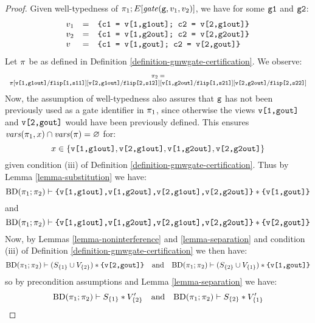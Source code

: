 \begin{proof}
  Given well-typedness of $\pi_1;E[\mathit{gate}(\texttt{g},v_1,v_2)]$, we have for some $\texttt{g1}$ and $\texttt{g2}$:
  $$
  \begin{array}{lcl}
   v_1 &=& \texttt{\{c1 = v[1,g1out]; c2 = v[2,g1out]\}}\\
   v_2 &=& \texttt{\{c1 = v[1,g2out]; c2 = v[2,g2out]\}}\\
    v &=& \texttt{\{c1 = v[1,gout]; c2 = v[2,gout]\}}
  \end{array}
  $$
  Let $\pi$ be as defined in Definition \ref{definition-gmwgate-certification}.
  We observe:
  $$
  {\footnotesize
    \begin{array}{c}
      \pi_2 = \\
      \pi[\texttt{v[1,g1out]}/\texttt{flip[1,s11]}][\texttt{v[2,g1out]}/\texttt{flip[2,s12]}][\texttt{v[1,g2out]}/\texttt{flip[1,s21]}][\texttt{v[2,g2out]}/\texttt{flip[2,s22]}]
    \end{array}
  }
  $$
  Now, the assumption of well-typedness also assures that $\texttt{g}$
  has not been previously used as a gate identifier in $\pi_1$,
  since otherwise the views $\texttt{v[1,gout]}$ and $\texttt{v[2,gout]}$
  would have been previously defined. This ensures $\mathit{vars}(\pi_1,x)
  \cap \mathit{vars}(\pi) = \varnothing$ for:
  $$x \in \{ \texttt{v[1,g1out]}, \texttt{v[2,g1out]}, \texttt{v[1,g2out]}, \texttt{v[2,g2out]}\}$$
  given condition (iii) of Definition \ref{definition-gmwgate-certification}.
  Thus by Lemma \ref{lemma-substitution} we have:
  $$\mathrm{BD}(\pi_1;\pi_2) \vdash \texttt{\{v[1,g1out],v[1,g2out],v[2,g1out],v[2,g2out]\}} * \texttt{\{v[1,gout]\}}$$
  and
  $$\mathrm{BD}(\pi_1;\pi_2) \vdash \texttt{\{v[1,g1out],v[1,g2out],v[2,g1out],v[2,g2out]\}} * \texttt{\{v[2,gout]\}}$$
  Now, by Lemmas \ref{lemma-noninterference} and \ref{lemma-separation} and condition (iii) of Definition
  \ref{definition-gmwgate-certification} we then have:
  $$\mathrm{BD}(\pi_1;\pi_2) \vdash (S_{\{1\}} \cup V_{\{2\}}) * \texttt{\{v[2,gout]\}} \quad \text{and} \quad
  \mathrm{BD}(\pi_1;\pi_2) \vdash (S_{\{2\}} \cup V_{\{1\}}) * \texttt{\{v[1,gout]\}}$$
  so by precondition assumptions and Lemma \ref{lemma-separation} we have:
  $$\mathrm{BD}(\pi_1;\pi_2) \vdash S_{\{1\}} * V'_{\{2\}} \quad \text{and} \quad
  \mathrm{BD}(\pi_1;\pi_2) \vdash S_{\{2\}} * V'_{\{1\}}$$
\end{proof}


